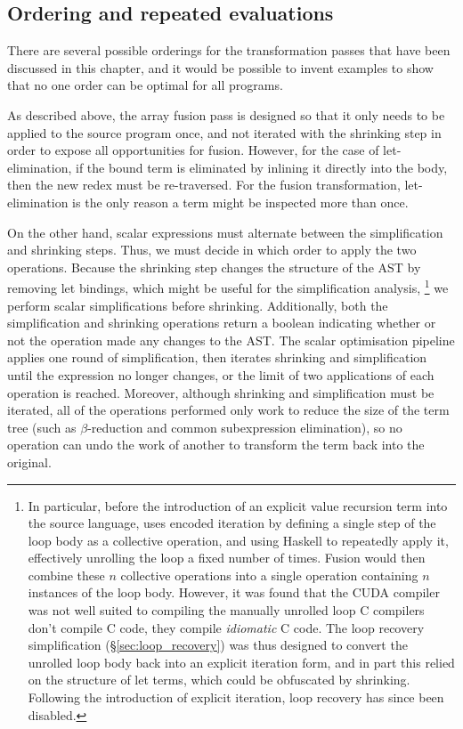 \subsection{Ordering and repeated evaluations}

There are several possible orderings for the transformation passes that have
been discussed in this chapter, and it would be possible to invent examples to
show that no one order can be optimal for all programs.

As described above, the array fusion pass is designed so that it only needs to
be applied to the source program once, and not iterated with the shrinking step
in order to expose all opportunities for fusion. However, for the case of
let-elimination, if the bound term is eliminated by inlining it directly into
the body, then the new redex must be re-traversed. For the fusion
transformation, let-elimination is the only reason a term might be inspected
more than once.

On the other hand, scalar expressions must alternate between the simplification
and shrinking steps. Thus, we must decide in which order to apply the two
operations. Because the shrinking step changes the structure of the AST by
removing let bindings, which might be useful for the simplification analysis,%
\footnote{In particular, before the introduction of an explicit value recursion
term into the source language, uses encoded iteration by defining a single step
of the loop body as a collective operation, and using Haskell to repeatedly
apply it, effectively unrolling the loop a fixed number of times. Fusion would
then combine these $n$ collective operations into a single operation containing
$n$ instances of the loop body. However, it was found that the CUDA compiler was
not well suited to compiling the manually unrolled loop C compilers don't
compile C code, they compile \emph{idiomatic} C code. The loop recovery
simplification (\S\ref{sec:loop_recovery}) was thus designed to convert the
unrolled loop body back into an explicit iteration form, and in part this relied
on the structure of let terms, which could be obfuscated by shrinking. Following
the introduction of explicit iteration, loop recovery has since been disabled.}
we perform scalar simplifications before shrinking. Additionally, both the
simplification and shrinking operations return a boolean indicating whether or
not the operation made any changes to the AST. The scalar optimisation pipeline
applies one round of simplification, then iterates shrinking and simplification
until the expression no longer changes, or the limit of two applications of each
operation is reached. Moreover, although shrinking and simplification must be
iterated, all of the operations performed only work to reduce the size of the
term tree (such as $\beta$-reduction and common subexpression elimination), so
no operation can undo the work of another to transform the term back into the
original.



